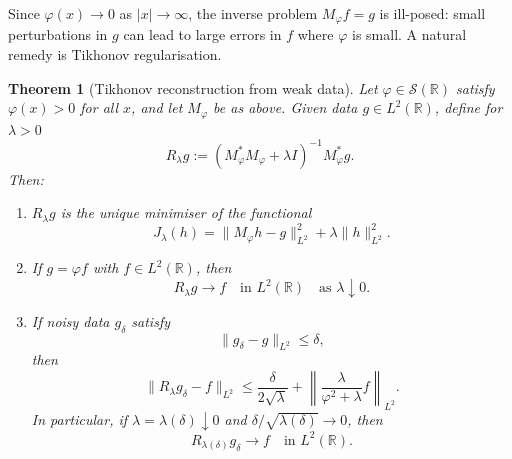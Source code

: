 \documentclass[12pt]{article}
\newtheorem{theorem}{Theorem}[section]
\theoremstyle{definition}
\newcommand{\R}{\mathbb{R}}
\begin{document}
Since $\varphi(x)\to 0$ as $|x|\to\infty$, the inverse problem
$M_\varphi f = g$ is ill-posed: small perturbations in $g$ can lead to large
errors in $f$ where $\varphi$ is small. A natural remedy is Tikhonov
regularisation.

\begin{theorem}[Tikhonov reconstruction from weak data]
\label{thm:tikhonov-reconstruction}
Let $\varphi\in\mathcal{S}(\R)$ satisfy $\varphi(x)>0$ for all $x$, and
let $M_\varphi$ be as above. Given data $g\in L^2(\R)$, define for
$\lambda>0$
\[
R_\lambda g
:=
(M_\varphi^* M_\varphi + \lambda I)^{-1} M_\varphi^* g.
\]
Then:

\begin{enumerate}
\item $R_\lambda g$ is the unique minimiser of the functional
\[
J_\lambda(h)
=
\|M_\varphi h - g\|_{L^2}^2
+
\lambda \|h\|_{L^2}^2.
\]

\item If $g = \varphi f$ with $f\in L^2(\R)$, then
\[
R_\lambda g \to f
\quad\text{in }L^2(\R)
\quad\text{as }\lambda\downarrow 0.
\]

\item If noisy data $g_\delta$ satisfy
\[
\|g_\delta - g\|_{L^2} \le \delta,
\]
then
\[
\|R_\lambda g_\delta - f\|_{L^2}
\le
\frac{\delta}{2\sqrt{\lambda}}
+
\left\|
\frac{\lambda}{\varphi^2 + \lambda} f
\right\|_{L^2}.
\]
In particular, if $\lambda=\lambda(\delta)\downarrow 0$ and
$\delta/\sqrt{\lambda(\delta)}\to 0$, then
\[
R_{\lambda(\delta)} g_\delta \to f
\quad\text{in }L^2(\R).
\]
\end{enumerate}
\end{theorem}
\end{document}
